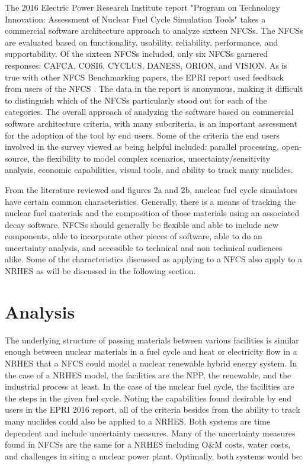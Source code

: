 \documentclass{article}                                                                           %
\begin{document}
\begin{linenumbers}
The 2016 Electric Power Research Institute report "Program on Technology Innovation: Assessment of Nuclear Fuel Cycle Simulation Tools" takes a commercial software architecture approach to analyze sixteen NFCSs.  The NFCSs are evaluated based on functionality, usability, reliability, performance, and supportability. Of the sixteen NFCSs included, only six NFCSs garnered responses: CAFCA, COSI6, CYCLUS, DANESS, ORION, and VISION. As is true with other NFCS Benchmarking papers, the EPRI report used feedback from users of the NFCS \cite{EPRI2016}.  The data in the report is anonymous, making it difficult to distinguish which of the NFCSs particularly stood out for each of the categories. The overall approach of analyzing the software based on commercial software architecture criteria, with many subcriteria, is an important assessment for the adoption of the tool by end users. Some of the criteria the end users involved in the survey viewed as being helpful included: parallel processing, open-source, the flexibility to model complex scenarios, uncertainty/sensitivity analysis, economic capabilities, visual tools, and ability to track many nuclides.

From the literature reviewed and figures 2a and 2b, nuclear fuel cycle simulators have certain common characteristics. Generally, there is a means of tracking the nuclear fuel materials and the composition of those materials using an associated decay software. NFCSs should generally be flexible and able to include new components, able to incorporate other pieces of software, able to do an uncertainty analysis, and accessible to technical and non technical audiences alike. Some of the characteristics discussed as applying to a NFCS also apply to a NRHES as will be discussed in the following section.

\section{Analysis}
The underlying structure of passing materials between various facilities is similar enough between nuclear materials in a fuel cycle and heat or electricity flow in a NRHES that a NFCS could model a nuclear renewable hybrid energy system. In the case of a NRHES model, the facilities are the NPP, the renewable, and the industrial process at least.  In the case of the nuclear fuel cycle, the facilities are the steps in the given fuel cycle. Noting the capabilities found desirable by end users in the EPRI 2016 report, all of the criteria besides from the ability to track many nuclides could also be applied to a NRHES. Both systems are time dependent and include uncertainty measures. Many of the uncertainty measures found in NFCSs are the same for a NRHES including O\&M costs, water costs, and challenges in siting a nuclear power plant. Optimally, both systems would be:
\begin{itemize}


\end{itemize}
\end{linenumbers}
\end{document}
